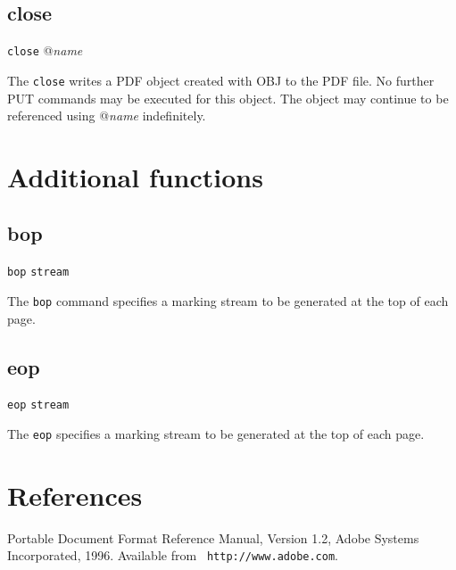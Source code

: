 \subsection{close}

{\tt close} @{\it name}

The {\tt close} writes a PDF object created with OBJ to the PDF file.
No further PUT commands may be executed for this object.
The object may continue to be referenced using @{\it name}
indefinitely.

\section{Additional functions}
\subsection{bop}

{\tt bop} {\tt stream}

The {\tt bop} command specifies a marking stream to be generated at the top of each page.

\subsection{eop}

{\tt eop} {\tt stream}

The {\tt eop} specifies a marking stream to be generated at the top of each page.


\newpage
\section{References}
 Portable Document Format Reference Manual, Version
1.2, Adobe Systems Incorporated, 1996.  Available from {\tt
  http://www.adobe.com}. 


\bye
